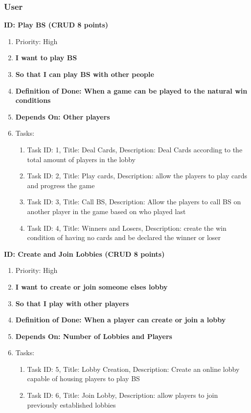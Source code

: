 \documentclass[12pt]{article}
\begin{document}
\subsubsection{User}
\textbf{ID: Play BS (CRUD 8 points)}
\begin{enumerate}
    \item Priority: High
    \item \textbf{I want to play BS}
    \item \textbf{So that I can play BS with other people}
    \item \textbf{Definition of Done: When a game can be played to the natural win conditions}
    \item \textbf{Depends On: Other players}
    \item Tasks:
    \begin{enumerate}
        \item Task ID: 1, Title: Deal Cards, Description: Deal Cards according to the total amount of players in the lobby
        \item Task ID: 2, Title: Play cards, Description: allow the players to play cards and progress the game
        \item Task ID: 3, Title: Call BS, Description: Allow the players to call BS on another player in the game based on who played last
        \item Task ID: 4, Title: Winners and Losers, Description: create the win condition of having no cards and be declared the winner or loser
    \end{enumerate}
\end{enumerate}
\textbf{ID: Create and Join Lobbies (CRUD 8 points)}
\begin{enumerate}
    \item Priority: High
    \item \textbf{I want to create or join someone elses lobby}
    \item \textbf{So that I play with other players}
    \item \textbf{Definition of Done: When a player can create or join a lobby}
    \item \textbf{Depends On: Number of Lobbies and Players}
    \item Tasks:
    \begin{enumerate}
        \item Task ID: 5, Title: Lobby Creation, Description: Create an online lobby capable of housing players to play BS
        \item Task ID: 6, Title: Join Lobby, Description: allow players to join previously established lobbies
    \end{enumerate}
\end{enumerate}
\end{document}
